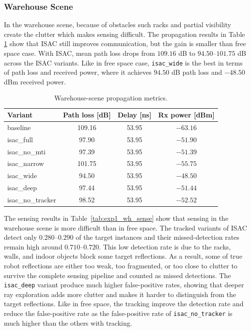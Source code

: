 \subsubsection{Warehouse Scene}
\label{subsubsec:controlled_validation_warehouse}

In the warehouse scene, because of obstacles such racks and partial visibility create the clutter which makes sensing difficult.
The propagation results in Table \ref{tab:exp1_wh_prop} show that ISAC still improves communication, but the gain is smaller than free space case.
With ISAC, mean path loss drops from $109.16$ dB to $94.50$--$101.75$ dB across the ISAC variants.
Like in free space case, \texttt{isac\_wide} is the best in terms of path loss and received power, where it achieves $94.50$ dB path loss and $-48.50$ dBm received power.

\begin{table}[t]
    \centering
    \caption{Warehouse-scene propagation metrics.}
    \label{tab:exp1_wh_prop}
    \footnotesize
    \begin{tabular}{lccc}
        \hline
        Variant           & Path loss [dB] & Delay [ns] & Rx power [dBm] \\
        \hline
        baseline          & 109.16         & 53.95      & $-63.16$       \\
        isac\_full        & 97.90          & 53.95      & $-51.90$       \\
        isac\_no\_mti     & 97.39          & 53.95      & $-51.39$       \\
        isac\_narrow      & 101.75         & 53.95      & $-55.75$       \\
        isac\_wide        & 94.50          & 53.95      & $-48.50$       \\
        isac\_deep        & 97.44          & 53.95      & $-51.44$       \\
        isac\_no\_tracker & 98.52          & 53.95      & $-52.52$       \\
        \hline
    \end{tabular}
\end{table}

The sensing results in Table~\ref{tab:exp1_wh_sense} show that sensing in the warehouse scene is more difficult than in free space.
The tracked variants of ISAC detect only $0.280$--$0.290$ of the target instances and their missed-detection rates remain high around $0.710$--$0.720$.
This low detection rate is due to the racks, walls, and indoor objects block some target reflections.
As a result, some of true robot reflections are either too weak, too fragmented, or too close to clutter to survive the complete sensing pipeline and counted as missed detections.
The \texttt{isac\_deep} variant produce much higher false-positive rates, showing that deeper ray exploration adds more clutter and makes it harder to distinguish from the target reflections.
Like in free space, the tracking improve the detection rate and reduce the false-positive rate as the false-positive rate of \texttt{isac\_no\_tracker} is much higher than the others with tracking.

